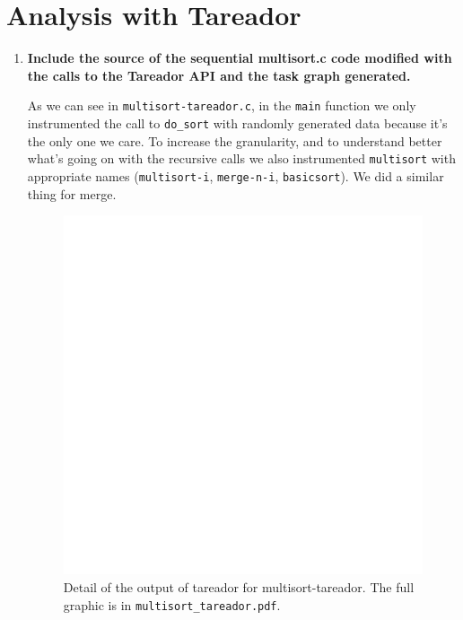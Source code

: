 \documentclass[a4paper,11pt]{article}
\begin{document}
\section{Analysis with Tareador}
\begin{enumerate}
\setcounter{enumi}{0}
\item
\textbf{Include the source of the sequential multisort.c code modified
  with the calls to the Tareador API and the task graph generated.}

As we can see in {\tt multisort-tareador.c}, in the {\tt main}
function we only instrumented the call to \texttt{do\_sort} with
randomly generated data because it's the only one we care. To increase
the granularity, and to understand better what's going on with the
recursive calls we also instrumented {\tt multisort} with appropriate
names ({\tt multisort-i}, {\tt merge-n-i}, {\tt basicsort}). We did a
similar thing for merge.

\vspace{0.5cm}
\begin{figure}[h!]
  \center
  \includegraphics[width=1.0\textwidth,trim={2cm 0 0 0},clip]{figs/multisort_tareador.pdf}
  \caption{Detail of the output of tareador for
    multisort-tareador. The full graphic is in
    {\tt multisort\_tareador.pdf}.}
  \label{fig:multisort-tareador}
\end{figure}
\vspace{0.5cm}


\end{enumerate}
\end{document}
